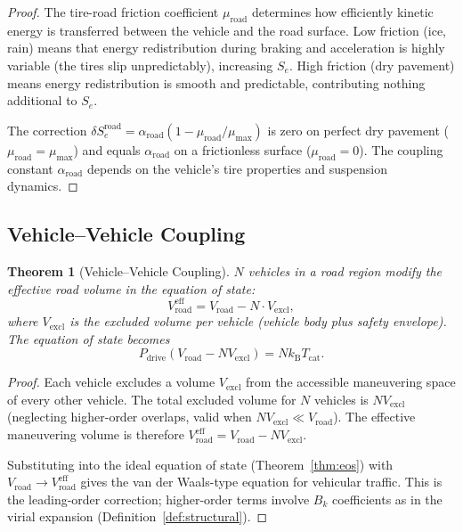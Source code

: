 \documentclass[twocolumn,10pt]{article}
\newtheorem{theorem}{Theorem}[section]
\newcommand{\kB}{k_{\mathrm{B}}}
\newcommand{\Tcat}{T_{\mathrm{cat}}}
\newcommand{\Pdrive}{P_{\mathrm{drive}}}
\newcommand{\Vroad}{V_{\mathrm{road}}}
\newcommand{\Se}{S_e}
\newcommand{\Vexcl}{V_{\mathrm{excl}}}
\begin{document}
\begin{proof}
The tire-road friction coefficient $\mu_{\mathrm{road}}$ determines how efficiently kinetic energy is transferred between the vehicle and the road surface. Low friction (ice, rain) means that energy redistribution during braking and acceleration is highly variable (the tires slip unpredictably), increasing $\Se$. High friction (dry pavement) means energy redistribution is smooth and predictable, contributing nothing additional to $\Se$.

The correction $\delta \Se^{\mathrm{road}} = \alpha_{\mathrm{road}} (1 - \mu_{\mathrm{road}}/\mu_{\mathrm{max}})$ is zero on perfect dry pavement ($\mu_{\mathrm{road}} = \mu_{\mathrm{max}}$) and equals $\alpha_{\mathrm{road}}$ on a frictionless surface ($\mu_{\mathrm{road}} = 0$). The coupling constant $\alpha_{\mathrm{road}}$ depends on the vehicle's tire properties and suspension dynamics.
\end{proof}

\subsection{Vehicle--Vehicle Coupling}

\begin{theorem}[Vehicle--Vehicle Coupling]\label{thm:vv_coupling}
$N$ vehicles in a road region modify the effective road volume in the equation of state:
\begin{equation}\label{eq:vv_coupling}
\Vroad^{\mathrm{eff}} = \Vroad - N \cdot \Vexcl,
\end{equation}
where $\Vexcl$ is the excluded volume per vehicle (vehicle body plus safety envelope). The equation of state becomes
\begin{equation}
\Pdrive (\Vroad - N\Vexcl) = N \kB \Tcat.
\end{equation}
\end{theorem}

\begin{proof}
Each vehicle excludes a volume $\Vexcl$ from the accessible maneuvering space of every other vehicle. The total excluded volume for $N$ vehicles is $N \Vexcl$ (neglecting higher-order overlaps, valid when $N\Vexcl \ll \Vroad$). The effective maneuvering volume is therefore $\Vroad^{\mathrm{eff}} = \Vroad - N\Vexcl$.

Substituting into the ideal equation of state (Theorem~\ref{thm:eos}) with $\Vroad \to \Vroad^{\mathrm{eff}}$ gives the van der Waals-type equation for vehicular traffic. This is the leading-order correction; higher-order terms involve $B_k$ coefficients as in the virial expansion (Definition~\ref{def:structural}).
\end{proof}
\end{document}
